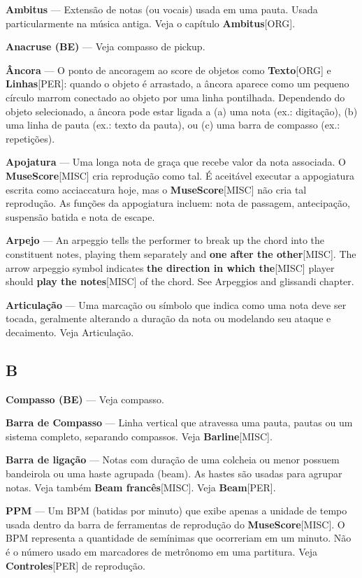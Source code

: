 \documentclass[a4paper,12pt]{article}
\begin{document}
\textbf{Ambitus} --- Extensão de notas (ou vocais) usada em uma pauta. Usada particularmente na música antiga. Veja o capítulo \textbf{Ambitus}\textsc{[ORG]}.

\textbf{Anacruse (BE)} --- Veja compasso de pickup.

\textbf{Âncora} --- O ponto de ancoragem ao score de objetos como \textbf{Texto}\textsc{[ORG]} e \textbf{Linhas}\textsc{[PER]}: quando o objeto é arrastado, a âncora aparece como um pequeno círculo marrom conectado ao objeto por uma linha pontilhada. Dependendo do objeto selecionado, a âncora pode estar ligada a (a) uma nota (ex.: digitação), (b) uma linha de pauta (ex.: texto da pauta), ou (c) uma barra de compasso (ex.: repetições).

\textbf{Apojatura} --- Uma longa nota de graça que recebe valor da nota associada. O \textbf{MuseScore}\textsc{[MISC]} cria reprodução como tal. É aceitável executar a appogiatura escrita como acciaccatura hoje, mas o \textbf{MuseScore}\textsc{[MISC]} não cria tal reprodução. As funções da appogiatura incluem: nota de passagem, antecipação, suspensão batida e nota de escape.

\textbf{Arpejo} --- An arpeggio tells the performer to break up the chord into the constituent notes, playing them separately and \textbf{one after the other}\textsc{[MISC]}. The arrow arpeggio symbol indicates \textbf{the direction in which the}\textsc{[MISC]} player should \textbf{play the notes}\textsc{[MISC]} of the chord. See Arpeggios and glissandi chapter.

\textbf{Articulação} --- Uma marcação ou símbolo que indica como uma nota deve ser tocada, geralmente alterando a duração da nota ou modelando seu ataque e decaimento. Veja Articulação.

\subsection*{B}
\textbf{Compasso (BE)} --- Veja compasso.

\textbf{Barra de Compasso} --- Linha vertical que atravessa uma pauta, pautas ou um sistema completo, separando compassos. Veja \textbf{Barline}\textsc{[MISC]}.

\textbf{Barra de ligação} --- Notas com duração de uma colcheia ou menor possuem bandeirola ou uma haste agrupada (beam). As hastes são usadas para agrupar notas. Veja também \textbf{Beam francês}\textsc{[MISC]}. Veja \textbf{Beam}\textsc{[PER]}.

\textbf{PPM} --- Um BPM (batidas por minuto) que exibe apenas a unidade de tempo usada dentro da barra de ferramentas de reprodução do \textbf{MuseScore}\textsc{[MISC]}. O BPM representa a quantidade de semínimas que ocorreriam em um minuto. Não é o número usado em marcadores de metrônomo em uma partitura. Veja \textbf{Controles}\textsc{[PER]} de reprodução.
\end{document}
